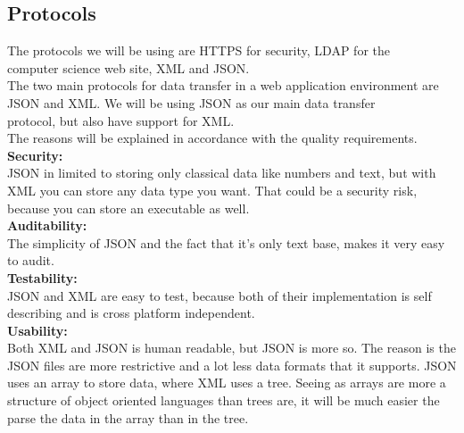 \documentclass[12pt]{article}
\begin{document}
		\vspace{0.5cm}
	
	\subsection{Protocols}
	
		\vspace{0.5cm}
	
		The protocols we will be using are HTTPS for security, LDAP for the \\ computer science web site, XML 		and JSON. \\
		\linebreak
		The two main protocols for data transfer in a web application environment are JSON and XML. We will be 	using JSON as our main data transfer \\ protocol, but also have support for XML. \\
		The reasons will be explained in accordance with the quality requirements.
		\\\linebreak
		 \textbf{Security:}
		\\\linebreak
		JSON in limited to storing only classical data like numbers and text, but with XML you can store any 		data type you want. That could be a security risk, because you can store an executable as well.
		\\\linebreak
		\textbf{Auditability:}
		\\\linebreak
		The simplicity of JSON and the fact that it’s only text base, makes it very easy to audit.
		\\\linebreak
		\textbf{Testability:}
		\\\linebreak
		JSON and XML are easy to test, because both of their implementation is self describing and is cross 		platform independent.
		\\\linebreak
		\textbf{Usability:}
		\\\linebreak
		Both XML and JSON is human readable, but JSON is more so. The reason is the JSON files are more 			restrictive and a lot less data formats that it supports. JSON uses an array to store data, where XML 		uses a tree. Seeing as arrays are more a structure of object oriented languages than trees are, it 			will be much easier the parse the data in the array than in the tree. 
\end{document}
